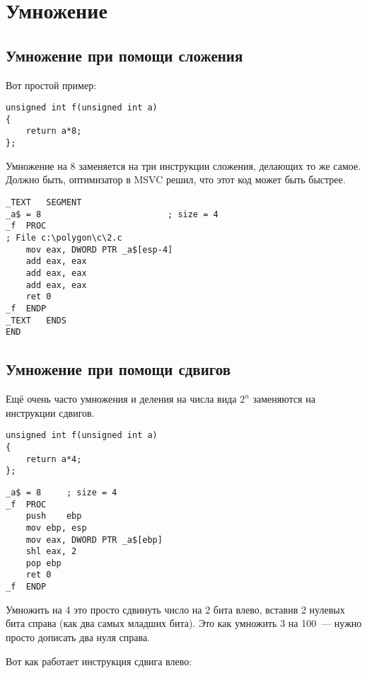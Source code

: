 ﻿\section{Умножение}

\subsection{Умножение при помощи сложения}

Вот простой пример:

\begin{lstlisting}[caption=\Optimizing MSVC 2010]
unsigned int f(unsigned int a)
{
	return a*8;
};
\end{lstlisting}

Умножение на 8 заменяется на три инструкции сложения, делающих то же самое.
Должно быть, оптимизатор в MSVC решил, что этот код может быть быстрее.


\begin{lstlisting}
_TEXT	SEGMENT
_a$ = 8							; size = 4
_f	PROC
; File c:\polygon\c\2.c
	mov	eax, DWORD PTR _a$[esp-4]
	add	eax, eax
	add	eax, eax
	add	eax, eax
	ret	0
_f	ENDP
_TEXT	ENDS
END
\end{lstlisting}

\subsection{Умножение при помощи сдвигов}
\label{subsec:mult_using_shifts}

Ещё очень часто умножения и деления на числа вида $2^{n}$ заменяются на инструкции сдвигов.

\begin{lstlisting}
unsigned int f(unsigned int a)
{
	return a*4;
};
\end{lstlisting}

\begin{lstlisting}[caption=\NonOptimizing MSVC 2010]
_a$ = 8		; size = 4
_f	PROC
	push	ebp
	mov	ebp, esp
	mov	eax, DWORD PTR _a$[ebp]
	shl	eax, 2
	pop	ebp
	ret	0
_f	ENDP
\end{lstlisting}

Умножить на 4 это просто сдвинуть число на 2 бита влево, 
вставив 2 нулевых бита справа (как два самых младших бита). 
Это как умножить 3 на 100~--- нужно просто дописать два нуля справа.

Вот как работает инструкция сдвига влево:



